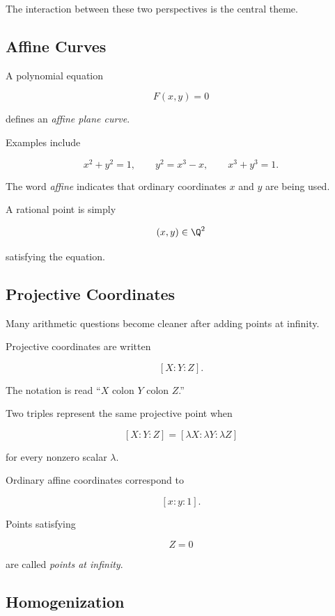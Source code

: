 The interaction between these two perspectives is the central theme.

\subsection{Affine Curves}
\label{subsec:affine-curves-diophantine}

A polynomial equation

\[ F(x,y)=0 \]

defines an \emph{affine plane curve}.

Examples include

\[
x^2+y^2=1,
\qquad
y^2=x^3-x,
\qquad
x^3+y^3=1.
\]

The word \emph{affine} indicates that ordinary coordinates \(x\) and \(y\)
are being used.

A rational point is simply

\[ (x,y)\in\Q^2 \]

satisfying the equation.

\subsection{Projective Coordinates}
\label{subsec:projective-coordinates-diophantine}

Many arithmetic questions become cleaner after adding points at infinity.

Projective coordinates are written

\[ [X:Y:Z]. \]

The notation is read ``\(X\) colon \(Y\) colon \(Z\).''

Two triples represent the same projective point when

\[ [X:Y:Z]=[\lambda X:\lambda Y:\lambda Z] \]

for every nonzero scalar \(\lambda\).

Ordinary affine coordinates correspond to

\[ [x:y:1]. \]

Points satisfying

\[ Z=0 \]

are called \emph{points at infinity}.

\subsection{Homogenization}
\label{subsec:homogenization-diophantine}

